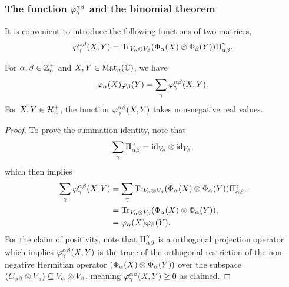 \documentclass[notitlepage, 11pt, letterpaper]{amsart}
\begin{document}
\subsubsection{The function \texorpdfstring{$\varphi^{\alpha \beta}_\gamma$}{phiabc} and the binomial theorem}

It is  convenient to introduce the following functions of two matrices,
\begin{equation}
    \varphi^{\alpha \beta}_\gamma(X, Y) =
    \operatorname{Tr}_{V_\alpha \otimes V_\beta}  (\Phi_\alpha(X) \otimes \Phi_\beta(Y)) \Pi_{\alpha\beta}^\gamma.
\end{equation}

\begin{prop}
    For $\alpha, \beta \in \mathbb Z^{+}_{n}$ and $X,Y \in \operatorname{Mat}_n(\mathbb{C})$, we have
    \begin{equation}
        \label{eq:varphi_product_sum}
        \varphi_\alpha(X) \varphi_\beta(Y) = \sum_\gamma \varphi^{\alpha \beta}_\gamma(X, Y).
    \end{equation}
    For $X,Y \in \mathcal H^{+}_{n}$, the function $\varphi^{\alpha \beta}_\gamma(X, Y)$ takes non-negative real values.
\end{prop}

\begin{proof}
    To prove the summation identity, note that
    \begin{equation}
        \sum_{\gamma} \Pi_{\alpha\beta}^\gamma = \operatorname{id}_{V_{\alpha}} \otimes \operatorname{id}_{V_{\beta}},
    \end{equation}
    which then implies
    \begin{align}
        \begin{split}
            \sum_\gamma \varphi^{\alpha \beta}_\gamma(X, Y)
            &= \sum_\gamma \operatorname{Tr}_{V_\alpha \otimes V_\beta}  (\Phi_\alpha(X) \otimes \Phi_\alpha(Y))\Pi_{\alpha\beta}^\gamma, \\
            &= \operatorname{Tr}_{V_\alpha \otimes V_\beta} (\Phi_\alpha(X) \otimes \Phi_\alpha(Y)), \\
            &= \varphi_\alpha(X) \varphi_\beta(Y).
        \end{split}
    \end{align}
    For the claim of positivity, note that $\Pi_{\alpha\beta}^\gamma$ is a orthogonal projection operator which implies $\varphi^{\alpha \beta}_\gamma(X, Y)$ is the trace of the orthogonal restriction of the non-negative Hermitian operator $(\Phi_\alpha(X) \otimes \Phi_\alpha(Y))$ over the subspace $(C_{\alpha \beta} \otimes V_\gamma) \subseteq V_\alpha \otimes V_\beta$, meaning $\varphi^{\alpha \beta}_\gamma(X, Y) \geq 0$ as claimed.
\end{proof}
\end{document}
